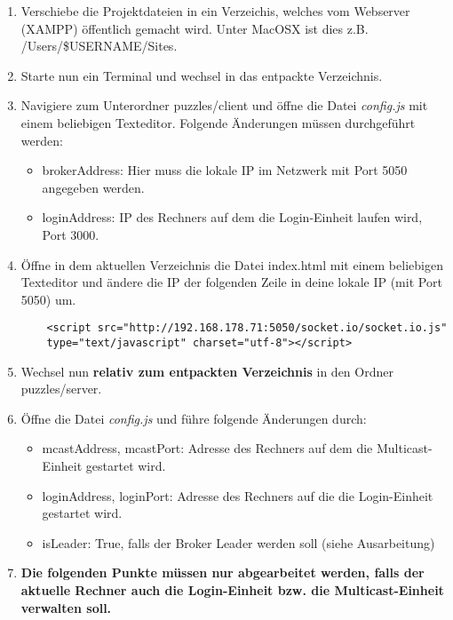 \documentclass[]{article}
\begin{document}
\begin{enumerate}
  \item Verschiebe die Projektdateien in ein Verzeichis, welches vom Webserver (XAMPP) öffentlich gemacht wird. Unter
  MacOSX ist dies z.B. /Users/\$USERNAME/Sites. 
  \item Starte nun ein Terminal und wechsel in das entpackte Verzeichnis.
  \item Navigiere zum Unterordner puzzles/client und öffne die Datei \emph{config.js} mit einem beliebigen Texteditor. Folgende Änderungen müssen durchgeführt werden:
  
  \begin{itemize}
    \item brokerAddress: Hier muss die lokale IP im Netzwerk mit Port 5050 angegeben werden.
    \item loginAddress: IP des Rechners auf dem die Login-Einheit laufen wird, Port 3000.
  \end{itemize}
  
  \item Öffne in dem aktuellen Verzeichnis die Datei index.html mit einem beliebigen Texteditor und ändere die IP der folgenden Zeile in
  deine lokale IP (mit Port 5050) um.
  \begin{verbatim}
    <script src="http://192.168.178.71:5050/socket.io/socket.io.js" 
    type="text/javascript" charset="utf-8"></script>
  \end{verbatim}
  
  \item Wechsel nun \textbf{relativ zum entpackten Verzeichnis} in den Ordner puzzles/server.
  \item Öffne die Datei \emph{config.js} und führe folgende Änderungen durch:
  
  \begin{itemize}
    \item mcastAddress, mcastPort: Adresse des Rechners auf dem die Multicast-Einheit gestartet wird.
    \item loginAddress, loginPort: Adresse des Rechners auf die die Login-Einheit gestartet wird.
    \item isLeader: True, falls der Broker Leader werden soll (siehe Ausarbeitung)
  \end{itemize}
  
  \item \textbf{Die folgenden Punkte müssen nur abgearbeitet werden, falls der aktuelle Rechner auch die Login-Einheit bzw.
    die Multicast-Einheit verwalten soll.}
  

\end{enumerate}
\end{document}
